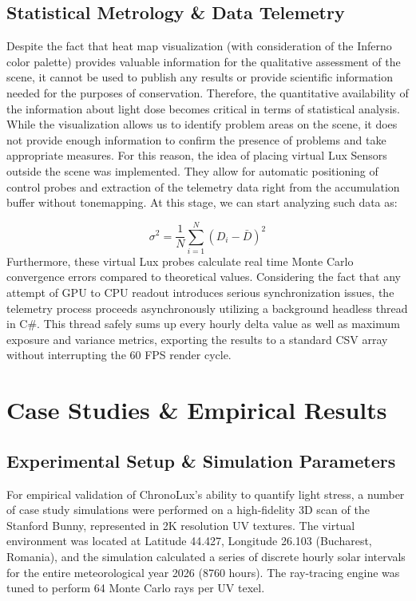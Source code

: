 \documentclass[conference]{IEEEtran}
\begin{document}
\subsection{Statistical Metrology \& Data Telemetry}

Despite the fact that heat map visualization (with consideration of the Inferno color palette) provides valuable information for the qualitative assessment of the scene, it cannot be used to publish any results or provide scientific information needed for the purposes of conservation. Therefore, the quantitative availability of the information about light dose becomes critical in terms of statistical analysis. While the visualization allows us to identify problem areas on the scene, it does not provide enough information to confirm the presence of problems and take appropriate measures. For this reason, the idea of placing virtual Lux Sensors outside the scene was implemented. They allow for automatic positioning of control probes and extraction of the telemetry data right from the accumulation buffer without tonemapping. At this stage, we can start analyzing such data as:

\begin{equation}
    \sigma^2 = \frac{1}{N} \sum_{i=1}^{N} (D_i - \bar{D})^2
\end{equation}
Furthermore, these virtual Lux probes calculate real time Monte Carlo convergence errors compared to theoretical values. Considering the fact that any attempt of GPU to CPU readout introduces serious synchronization issues, the telemetry process proceeds asynchronously utilizing a background headless thread in C\#. This thread safely sums up every hourly delta value as well as maximum exposure and variance metrics, exporting the results to a standard CSV array without interrupting the 60 FPS render cycle.

\section{Case Studies \& Empirical Results}

\subsection{Experimental Setup \& Simulation Parameters}
For empirical validation of ChronoLux's ability to quantify light stress, a number of case study simulations were performed on a high-fidelity 3D scan of the Stanford Bunny, represented in 2K resolution UV textures. The virtual environment was located at Latitude 44.427, Longitude 26.103 (Bucharest, Romania), and the simulation calculated a series of discrete hourly solar intervals for the entire meteorological year 2026 (8760 hours). The ray-tracing engine was tuned to perform 64 Monte Carlo rays per UV texel.
\end{document}
